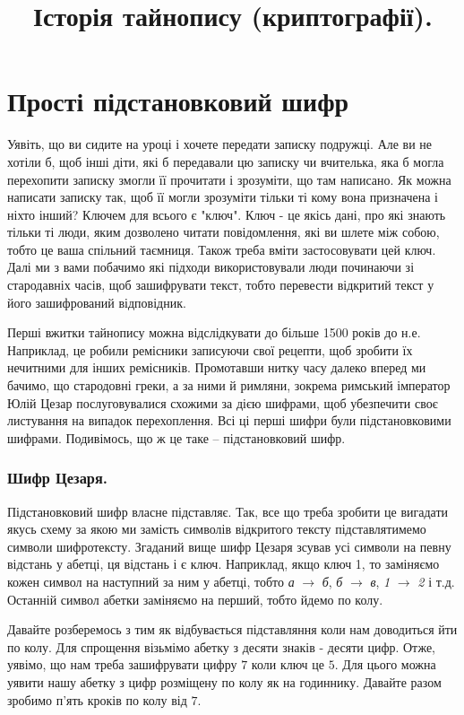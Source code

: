 \documentclass{book}
\title{Історія тайнопису (криптографії).}
\begin{document}
\maketitle

\chapter*{Прості підстановковий шифр}

Уявіть, що ви сидите на уроці і хочете передати записку подружці. Але ви не
хотіли б, щоб інші діти, які б передавали цю записку чи вчителька, яка б могла
перехопити записку змогли її прочитати і зрозуміти, що там написано. Як можна
написати записку так, щоб її могли зрозуміти тільки ті кому вона призначена і
ніхто інший? Ключем для всього є "ключ". Ключ - це якісь дані, про які знають
тільки ті люди, яким дозволено читати повідомлення, які ви шлете між собою,
тобто це ваша спільний таємниця. Також треба вміти застосовувати цей ключ. Далі
ми з вами побачимо які підходи використовували люди починаючи зі стародавніх
часів, щоб зашифрувати текст, тобто перевести відкритий текст у його
зашифрований відповідник.

Перші вжитки тайнопису можна відслідкувати до більше 1500 років до н.е.
Наприклад, це робили ремісники записуючи свої рецепти, щоб зробити їх нечитними
для інших ремісників. Промотавши нитку часу далеко вперед ми бачимо, що
стародовні греки, а за ними й римляни, зокрема римський імператор Юлій Цезар послуговувалися
схожими за дією шифрами, щоб убезпечити своє листування на випадок
перехоплення. Всі ці перші шифри були підстановковими шифрами. Подивімось, що ж це
таке -- підстановковий шифр.

\subsection*{Шифр Цезаря.}

Підстановковий шифр власне підставляє. Так, все що треба зробити це вигадати
якусь схему за якою ми замість символів відкритого тексту підставлятимемо
символи шифротексту. Згаданий вище шифр Цезаря зсував усі символи на певну
відстань у абетці, ця відстань і є ключ. Наприклад, якщо ключ 1, то заміняємо
кожен символ на наступний за ним у абетці, тобто \emph{а} $\to$ \emph{б},
\emph{б} $\to$ \emph{в}, \emph{1} $\to$ \emph{2} і т.д. Останній символ абетки
заміняємо на перший, тобто йдемо по колу.

Давайте розберемось з тим як відбувається підставляння коли нам доводиться йти
по колу. Для спрощення візьмімо абетку з десяти знаків - десяти цифр. Отже,
уявімо, що нам треба зашифрувати цифру $7$ коли ключ це $5$. Для цього можна уявити
нашу абетку з цифр розміщену по колу як на годиннику. Давайте разом зробимо
п'ять кроків по колу від $7$.
\end{document}
